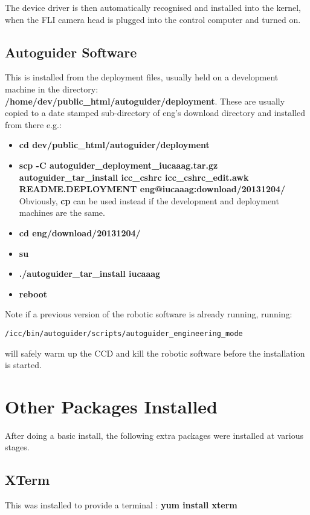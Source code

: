 \documentclass[10pt,a4paper]{article}
\begin{document}
The device driver is then automatically recognised and installed into the kernel, when the FLI camera head is plugged into the control computer and turned on.

\subsection{Autoguider Software}

This is installed from the deployment files, usually held on a development machine in the directory:
{\bf /home/dev/public\_html/autoguider/deployment}. These are usually copied to a date stamped sub-directory of eng's download directory and installed from there e.g.:

\begin{itemize}
\item {\bf cd \mytilde dev/public\_html/autoguider/deployment}
\item {\bf scp -C autoguider\_deployment\_iucaaag.tar.gz autoguider\_tar\_install icc\_cshrc icc\_cshrc\_edit.awk README.DEPLOYMENT eng@iucaaag:download/20131204/} Obviously, {\bf cp} can be used instead if the development and deployment machines are the same.
\item {\bf cd \mytilde eng/download/20131204/}
\item {\bf su}
\item {\bf ./autoguider\_tar\_install iucaaag}
\item {\bf reboot}
\end{itemize}

Note if a previous version of the robotic software is already running, running:
\begin{verbatim}
/icc/bin/autoguider/scripts/autoguider_engineering_mode
\end{verbatim}
will safely warm up the CCD and kill the robotic software before the installation is started.

\section{Other Packages Installed}

After doing a basic install, the following extra packages were installed at various stages.

\subsection{XTerm}

This was installed to provide a terminal : {\bf yum install xterm}
\end{document}
